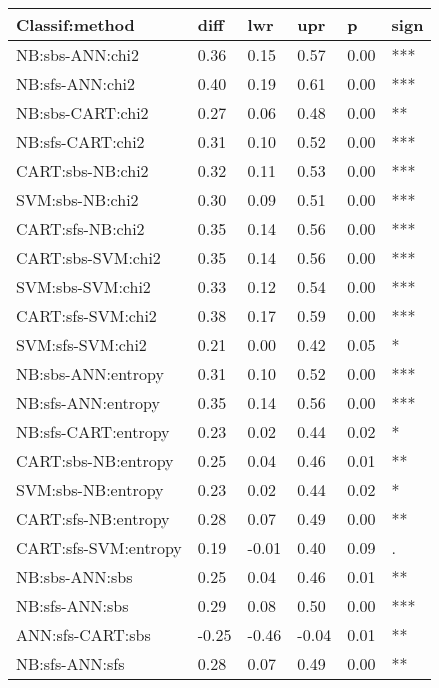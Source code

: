 \begin{tabular}{|l|l|l|l|l|l|}
\toprule
       Classif:method &   diff &    lwr &    upr &     p & sign \\
\midrule
      NB:sbs-ANN:chi2 &   0.36 &   0.15 &   0.57 &  0.00 &  *** \\
      NB:sfs-ANN:chi2 &   0.40 &   0.19 &   0.61 &  0.00 &  *** \\
     NB:sbs-CART:chi2 &   0.27 &   0.06 &   0.48 &  0.00 &   ** \\
     NB:sfs-CART:chi2 &   0.31 &   0.10 &   0.52 &  0.00 &  *** \\
     CART:sbs-NB:chi2 &   0.32 &   0.11 &   0.53 &  0.00 &  *** \\
      SVM:sbs-NB:chi2 &   0.30 &   0.09 &   0.51 &  0.00 &  *** \\
     CART:sfs-NB:chi2 &   0.35 &   0.14 &   0.56 &  0.00 &  *** \\
    CART:sbs-SVM:chi2 &   0.35 &   0.14 &   0.56 &  0.00 &  *** \\
     SVM:sbs-SVM:chi2 &   0.33 &   0.12 &   0.54 &  0.00 &  *** \\
    CART:sfs-SVM:chi2 &   0.38 &   0.17 &   0.59 &  0.00 &  *** \\
     SVM:sfs-SVM:chi2 &   0.21 &   0.00 &   0.42 &  0.05 &    * \\
   NB:sbs-ANN:entropy &   0.31 &   0.10 &   0.52 &  0.00 &  *** \\
   NB:sfs-ANN:entropy &   0.35 &   0.14 &   0.56 &  0.00 &  *** \\
  NB:sfs-CART:entropy &   0.23 &   0.02 &   0.44 &  0.02 &    * \\
  CART:sbs-NB:entropy &   0.25 &   0.04 &   0.46 &  0.01 &   ** \\
   SVM:sbs-NB:entropy &   0.23 &   0.02 &   0.44 &  0.02 &    * \\
  CART:sfs-NB:entropy &   0.28 &   0.07 &   0.49 &  0.00 &   ** \\
 CART:sfs-SVM:entropy &   0.19 &  -0.01 &   0.40 &  0.09 &    . \\
       NB:sbs-ANN:sbs &   0.25 &   0.04 &   0.46 &  0.01 &   ** \\
       NB:sfs-ANN:sbs &   0.29 &   0.08 &   0.50 &  0.00 &  *** \\
     ANN:sfs-CART:sbs &  -0.25 &  -0.46 &  -0.04 &  0.01 &   ** \\
       NB:sfs-ANN:sfs &   0.28 &   0.07 &   0.49 &  0.00 &   ** \\
\bottomrule
\end{tabular}
